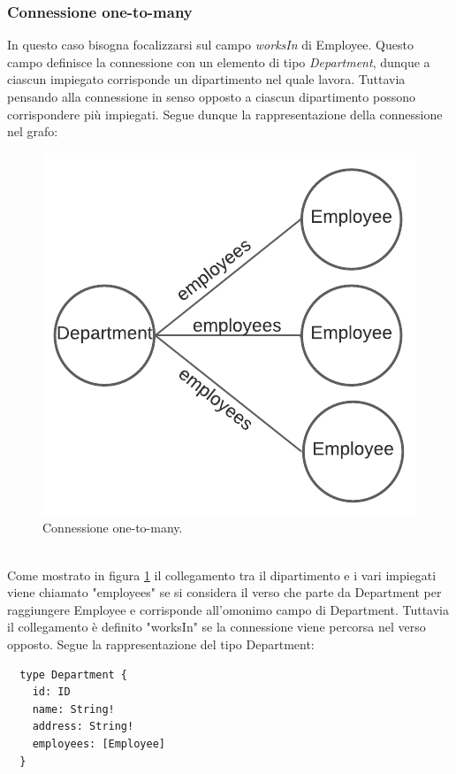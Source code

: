 \subsubsection*{Connessione one-to-many}
In questo caso bisogna focalizzarsi sul campo \textit{worksIn} di Employee. Questo campo definisce la connessione con un elemento di tipo \textit{Department}, dunque a ciascun impiegato corrisponde un dipartimento nel quale lavora. Tuttavia pensando alla connessione in senso opposto a ciascun dipartimento possono corrispondere più impiegati. Segue dunque la rappresentazione della connessione nel grafo:\\

\begin{figure}[!h]
\centering
\includegraphics[width=0.4\linewidth]{immagini/one_to_many.pdf}
\caption{Connessione one-to-many.}
\label{one-to-many}
\end{figure}
\mbox{}\\
Come mostrato in figura \ref{one-to-many} il collegamento tra il dipartimento e i vari impiegati viene chiamato "employees" se si considera il verso che parte da Department per raggiungere Employee e corrisponde all'omonimo campo di Department. Tuttavia il collegamento è definito "worksIn" se la connessione viene percorsa nel verso opposto. Segue la rappresentazione del tipo Department:
\begin{verbatim}
  type Department {
    id: ID
    name: String!
    address: String!
    employees: [Employee]
  }
\end{verbatim}
